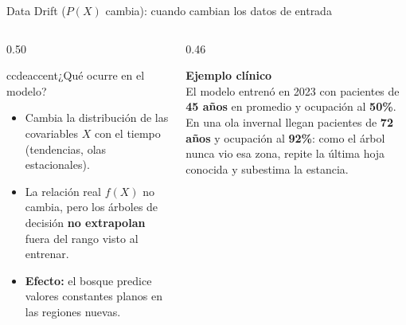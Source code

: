 \documentclass[aspectratio=169,11pt,table]{beamer}
\begin{document}
\begin{frame}{Data Drift ($P(X)$ cambia): cuando cambian los datos de entrada}
\begin{columns}[T,onlytextwidth]
\begin{column}{0.50\textwidth}
\begin{contrastbox}{ccdeaccent}{¿Qué ocurre en el modelo?}
\footnotesize
\begin{itemize}
  \item Cambia la distribución de las covariables $X$ con el tiempo (tendencias, olas estacionales).
  \item La relación real $f(X)$ no cambia, pero los árboles de decisión \textbf{no extrapolan} fuera del rango visto al entrenar.
  \item \textbf{Efecto:} el bosque predice valores constantes planos en las regiones nuevas.
\end{itemize}
\end{contrastbox}
\end{column}
\begin{column}{0.46\textwidth}
\begin{keybox}
\footnotesize
\textbf{Ejemplo clínico}\\[0.10cm]
El modelo entrenó en 2023 con pacientes de \textbf{45 años} en promedio y ocupación al \textbf{50\%}.\\[0.12cm]
En una ola invernal llegan pacientes de \textbf{72 años} y ocupación al \textbf{92\%}: como el árbol nunca vio esa zona, repite la última hoja conocida y subestima la estancia.
\end{keybox}
\end{column}
\end{columns}
\end{frame}
\end{document}
